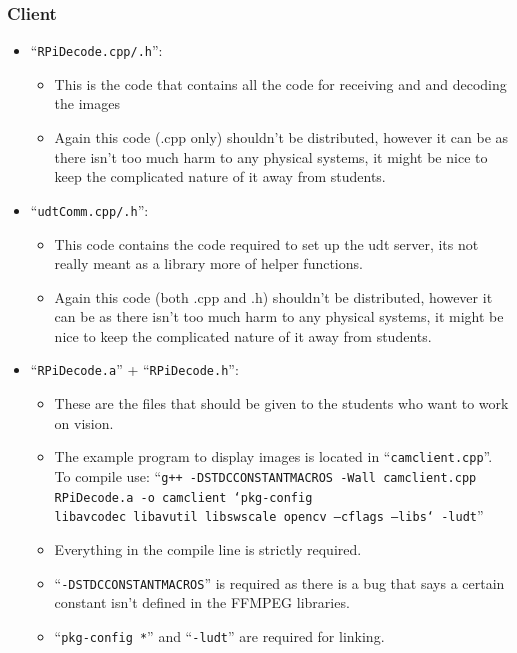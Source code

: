 \documentclass{article}
\begin{document}
\subsubsection{Client}
\begin{itemize}
    \item ``{\tt RPiDecode.cpp/.h}'':
    \begin{itemize}
        \item This is the code that contains all the code for receiving and and decoding the images
        \item Again this code (.cpp only) shouldn't be distributed, however it can be as there isn't too much harm to any physical systems, it might be nice to keep the complicated nature of it away from students.
    \end{itemize}
    \item ``{\tt udtComm.cpp/.h}'':
    \begin{itemize}
        \item This code contains the code required to set up the udt server, its not really meant as a library more of helper functions.
        \item Again this code (both .cpp and .h) shouldn't be distributed, however it can be as there isn't too much harm to any physical systems, it might be nice to keep the complicated nature of it away from students.
    \end{itemize}
    \item ``{\tt RPiDecode.a}'' + ``{\tt RPiDecode.h}'':
    \begin{itemize}
        \item These are the files that should be given to the students who want to work on vision. 
        \item The example program to display images is located in ``{\tt camclient.cpp}''. To compile use: ``{\tt g++ -D\textunderscore \textunderscore STDC\textunderscore CONSTANT\textunderscore MACROS -Wall camclient.cpp RPiDecode.a -o camclient `pkg-config \\ libavcodec libavutil libswscale opencv --cflags --libs` -ludt}''
        \item Everything in the compile line is strictly required.
        \item ``{\tt -D\textunderscore \textunderscore STDC\textunderscore CONSTANT\textunderscore MACROS}'' is required as there is a bug that says a certain constant isn't defined in the FFMPEG libraries.
        \item ``{\tt pkg-config *}'' and ``{\tt -ludt}'' are required for linking.
    \end{itemize}
\end{itemize}
\end{document}
